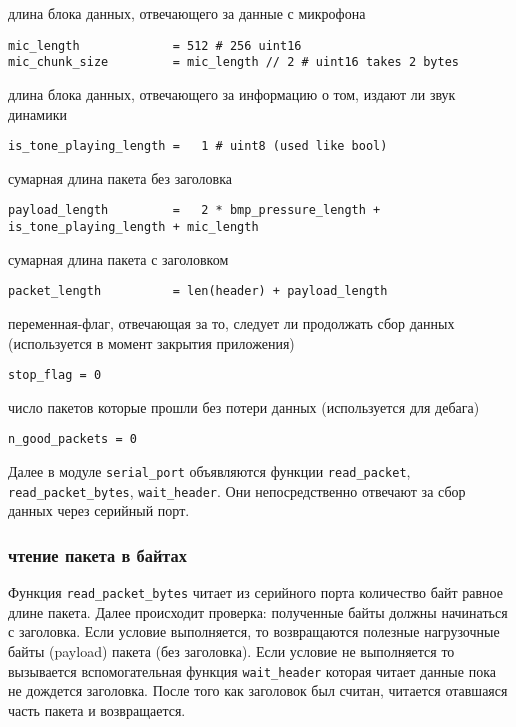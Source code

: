 \documentclass[../main.tex]{subfiles}
\begin{document}
длина блока данных, отвечающего за данные с микрофона
\begin{lstlisting}
mic_length             = 512 # 256 uint16
mic_chunk_size         = mic_length // 2 # uint16 takes 2 bytes
\end{lstlisting}

длина блока данных, отвечающего за информацию о том, издают ли звук динамики
\begin{lstlisting}
is_tone_playing_length =   1 # uint8 (used like bool)
\end{lstlisting}

сумарная длина пакета без заголовка
\begin{lstlisting}
payload_length         =   2 * bmp_pressure_length + is_tone_playing_length + mic_length
\end{lstlisting}

сумарная длина пакета с заголовком
\begin{lstlisting}
packet_length          = len(header) + payload_length
\end{lstlisting}

переменная-флаг, отвечающая за то, следует ли продолжать сбор данных
(используется в момент закрытия приложения)
\begin{lstlisting}
stop_flag = 0
\end{lstlisting}

число пакетов которые прошли без потери данных (используется для дебага)
\begin{lstlisting}
n_good_packets = 0
\end{lstlisting}

Далее в модуле \texttt{serial\_port} объявляются функции \verb|read_packet|, \texttt{read\_packet\_bytes}, \texttt{wait\_header}. Они непосредственно отвечают за сбор данных через серийный порт. 

\subsubsection{чтение пакета в байтах}
Функция \texttt{read\_packet\_bytes} читает из серийного порта количество байт равное длине пакета. Далее происходит проверка: полученные байты должны начинаться с заголовка. Если условие выполняется, то возвращаются полезные нагрузочные байты (payload) пакета (без заголовка). Если условие не выполняется то вызывается вспомогательная функция \texttt{wait\_header} которая читает данные пока не дождется заголовка. После того как заголовок был считан, читается отавшаяся часть пакета и возвращается.
\end{document}

